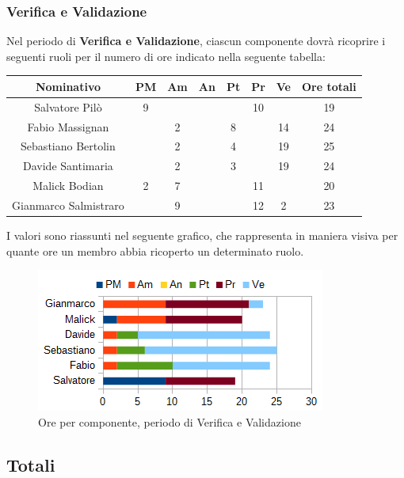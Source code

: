 		\subsubsection{Verifica e Validazione}
		Nel periodo di \textbf{Verifica e Validazione}, ciascun componente dovrà ricoprire i seguenti ruoli per il numero di ore indicato nella seguente tabella: \\
		\begin{table}[H]
		\centering
		\begin{tabular}{|c|c|c|c|c|c|c|c|}
			\hline
			\textbf{Nominativo}		& \textbf{PM}	& \textbf{Am}	& \textbf{An}	& \textbf{Pt}	& \textbf{Pr}	& \textbf{Ve}	& \textbf{Ore totali}     \\
			\hline
			Salvatore Pilò			& 9		& 		& 		&		& 10	&		& 19 \\
			Fabio Massignan			&		& 2		&		& 8		&		& 14	& 24 \\
			Sebastiano Bertolin		&		& 2		& 		& 4		&		& 19	& 25 \\
			Davide Santimaria		&		& 2		& 		& 3		&		& 19	& 24 \\
			Malick Bodian			& 2		& 7		&		&		& 11	& 		& 20 \\
			Gianmarco Salmistraro	&		& 9		& 		&		& 12	& 2		& 23 \\
			\hline
		\end{tabular}
		\end{table}
		I valori sono riassunti nel seguente grafico, che rappresenta in maniera visiva per quante ore un membro abbia ricoperto un determinato ruolo. \\
		\begin{figure}[H]
			\centering
			\includegraphics[scale=1]{immagini/grafici/validazione-barra.png}
			\caption{Ore per componente, periodo di Verifica e Validazione}
		\end{figure}
	\subsection{Totali}
